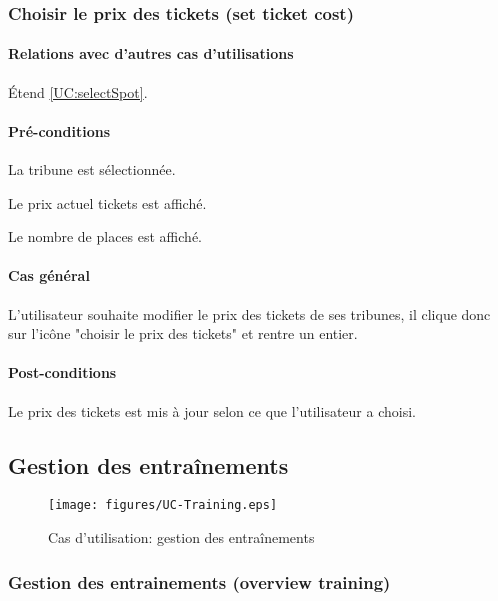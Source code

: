 \subsubsection{Choisir le prix des tickets (set ticket cost)}
\label{UC:setTicketPrice}
\paragraph{Relations avec d'autres cas d'utilisations}
Étend \ref{UC:selectSpot}.
\paragraph{Pré-conditions}
\begin{list}{}{\leftmargin=1.5em}
\item{La tribune est sélectionnée.}
\item{Le prix actuel tickets est affiché.}
\item{Le nombre de places est affiché.}
\end{list}
\paragraph{Cas général}
L'utilisateur souhaite modifier le prix des tickets de ses tribunes, il clique donc sur l'icône "choisir le prix des tickets" et rentre un entier.
\paragraph{Post-conditions}
\begin{list}{}{\leftmargin=1.5em}
\item{Le prix des tickets est mis à jour selon ce que l'utilisateur a choisi.}
\end{list}

\subsection{Gestion des entraînements}
\label{UC:trainingManagement}
\begin{figure}[h]
  \centering
  \texttt{[image: figures/UC-Training.eps]}
   \caption{\label{fig:UC:trainingManagement} Cas d'utilisation: gestion des entraînements}
\end{figure}

\subsubsection{Gestion des entrainements (overview training)}
\label{UC:trainingManagement}
